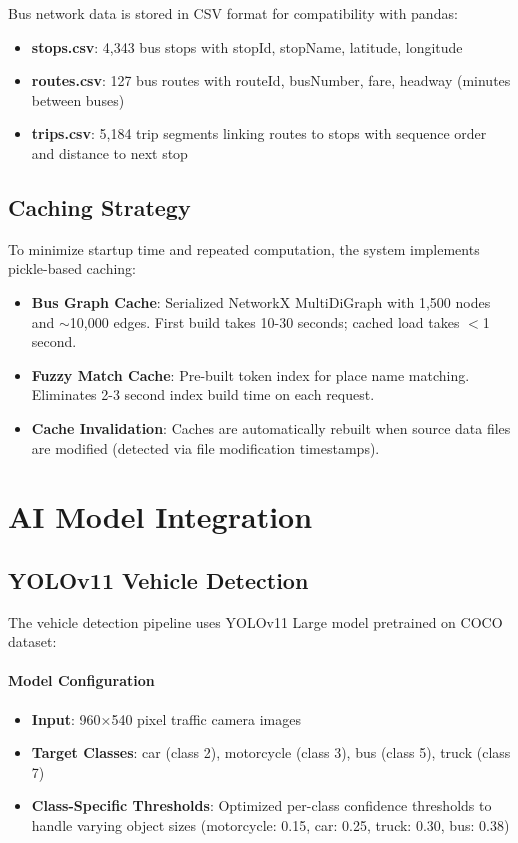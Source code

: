 Bus network data is stored in CSV format for compatibility with pandas:

\begin{itemize}[noitemsep]
    \item \textbf{stops.csv}: 4,343 bus stops with stopId, stopName, latitude, longitude
    \item \textbf{routes.csv}: 127 bus routes with routeId, busNumber, fare, headway (minutes between buses)
    \item \textbf{trips.csv}: 5,184 trip segments linking routes to stops with sequence order and distance to next stop
\end{itemize}

\subsection{Caching Strategy}

To minimize startup time and repeated computation, the system implements pickle-based caching:

\begin{itemize}[noitemsep]
    \item \textbf{Bus Graph Cache}: Serialized NetworkX MultiDiGraph with 1,500 nodes and $\sim$10,000 edges. First build takes 10-30 seconds; cached load takes $<$1 second.
    
    \item \textbf{Fuzzy Match Cache}: Pre-built token index for place name matching. Eliminates 2-3 second index build time on each request.
    
    \item \textbf{Cache Invalidation}: Caches are automatically rebuilt when source data files are modified (detected via file modification timestamps).
\end{itemize}

\section{AI Model Integration}

\subsection{YOLOv11 Vehicle Detection}

The vehicle detection pipeline uses YOLOv11 Large model pretrained on COCO dataset:

\paragraph{Model Configuration}
\begin{itemize}[noitemsep]
    \item \textbf{Input}: 960×540 pixel traffic camera images
    \item \textbf{Target Classes}: car (class 2), motorcycle (class 3), bus (class 5), truck (class 7)
    \item \textbf{Class-Specific Thresholds}: Optimized per-class confidence thresholds to handle varying object sizes (motorcycle: 0.15, car: 0.25, truck: 0.30, bus: 0.38)
\end{itemize}

